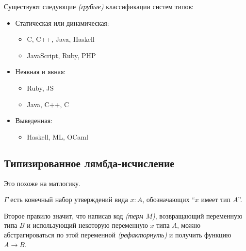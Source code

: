 Существуют следующие \textit{(грубые)} классификации систем типов:
\begin{itemize}
    \item Статическая или динамическая:
          \begin{itemize}
              \item C, C++, Java, Haskell
              \item JavaScript, Ruby, PHP
          \end{itemize}
    \item Неявная и явная:
          \begin{itemize}
              \item Ruby, JS
              \item Java, C++, C
          \end{itemize}
    \item Выведенная:
          \begin{itemize}
              \item Haskell, ML, OCaml
          \end{itemize}
\end{itemize}

\subsection{Типизированное лямбда-исчисление}

Это похоже на матлогику.

\begin{center}
    \begin{prooftree}
    \end{prooftree}
    \qquad
    \begin{prooftree}
    \end{prooftree}
    \qquad
    \begin{prooftree}
    \end{prooftree}
\end{center}

\(\Gamma\) есть конечный набор утверждений вида \(x : A\), обозначающих ``\(x\) имеет тип \(A\)''.

Второе правило значит, что написав код \textit{(терм \(M\))}, возвращающий переменную типа \(B\) и использующий некоторую переменную \(x\) типа \(A\), можно абстрагироваться по этой переменной \textit{(рефакторнуть)} и получить функцию \(A \to B\).

